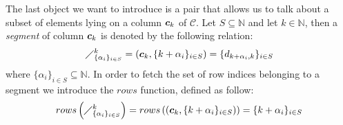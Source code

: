The last object we want to introduce is a pair that allows us 
to talk about a subset of elements lying on a
column $\boldsymbol{c}_{k}$ of $\mathcal{C}$. Let $S\subseteq\mathbb{N}$  
and let $k\in\mathbb{N}$, then a \emph{segment} of column $\boldsymbol{c}_{k}$ is
denoted by the following relation:
\begin{equation}
    \diagup_{\lbrace\alpha_{i}\rbrace_{i\in S}}^{k}
        = \left(\boldsymbol{c}_{k},\lbrace k+\alpha_{i}\rbrace_{i\in S}\right)
        = \lbrace d_{k+\alpha_{i},k}\rbrace_{i\in S}
    \label{eq:column:segment}
\end{equation}
where $\lbrace\alpha_{i}\rbrace_{i\in S}\subseteq\mathbb{N}$. 
In order to fetch the set of 
row indices belonging to a segment we introduce the $rows$ function, defined as follow:
\begin{displaymath}
    rows\left(\diagup_{\lbrace\alpha_{i}\rbrace_{i\in S}}^{k}\right)
        = rows\left(\left(\boldsymbol{c}_{k},\lbrace k+\alpha_{i}\rbrace_{i\in S}\right)\right)
        = \lbrace k+\alpha_{i}\rbrace_{i\in S}
    \label{eq:column:segment:rows:function}
\end{displaymath}


